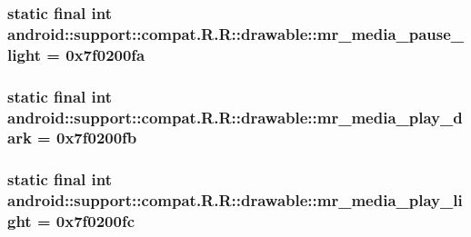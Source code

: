 \hypertarget{classandroid_1_1support_1_1compat_1_1_r_1_1drawable_550e3db864b330ab7a7a74de2bf285b3}{
\subsubsection[{mr\_\-media\_\-pause\_\-light}]{\setlength{\rightskip}{0pt plus 5cm}static final int android::support::compat.R.R::drawable::mr\_\-media\_\-pause\_\-light = 0x7f0200fa}}
\label{classandroid_1_1support_1_1compat_1_1_r_1_1drawable_550e3db864b330ab7a7a74de2bf285b3}


\hypertarget{classandroid_1_1support_1_1compat_1_1_r_1_1drawable_dcb84b2f124ea39975d475e2ce6ccf8a}{
\subsubsection[{mr\_\-media\_\-play\_\-dark}]{\setlength{\rightskip}{0pt plus 5cm}static final int android::support::compat.R.R::drawable::mr\_\-media\_\-play\_\-dark = 0x7f0200fb}}
\label{classandroid_1_1support_1_1compat_1_1_r_1_1drawable_dcb84b2f124ea39975d475e2ce6ccf8a}


\hypertarget{classandroid_1_1support_1_1compat_1_1_r_1_1drawable_ce41fdaddb2ee52893994429ad2993c2}{
\subsubsection[{mr\_\-media\_\-play\_\-light}]{\setlength{\rightskip}{0pt plus 5cm}static final int android::support::compat.R.R::drawable::mr\_\-media\_\-play\_\-light = 0x7f0200fc}}
\label{classandroid_1_1support_1_1compat_1_1_r_1_1drawable_ce41fdaddb2ee52893994429ad2993c2}


